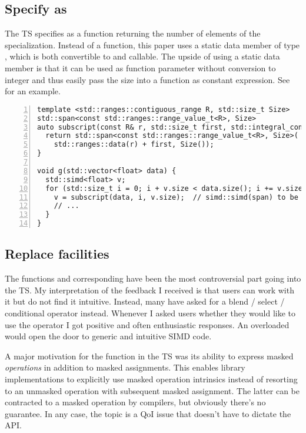 \subsection{Specify  as }
The TS specifies  as a  function returning the number of elements of the  specialization.
Instead of a function, this paper uses a static data member of type , which is both convertible to  and callable.
The upside of using a static data member is that it can be used as function parameter without conversion to integer and thus easily pass the size into a function as constant expression.
See  for an example.
\begin{lstlisting}[numbers=left,float={hbtp},label=lst:sizeparam,caption={
    Example: Pass \code{simd::size} as ``constant expression function argument''
}]
template <std::ranges::contiguous_range R, std::size_t Size>
std::span<const std::ranges::range_value_t<R>, Size>
auto subscript(const R& r, std::size_t first, std::integral_constant<std::size_t, Size>) {
  return std::span<const std::ranges::range_value_t<R>, Size>(
    std::ranges::data(r) + first, Size());
}

void g(std::vector<float> data) {
  std::simd<float> v;
  for (std::size_t i = 0; i + v.size < data.size(); i += v.size) {
    v = subscript(data, i, v.size);  // simd::simd(span) to be proposed
    // ...
  }
}
\end{lstlisting}


\subsection{Replace  facilities}

The  functions and corresponding  have been
the most controversial part going into the TS.
My interpretation of the feedback I received is that users can work with it but
do not find it intuitive.
Instead, many have asked for a blend / select / conditional operator instead.
Whenever I asked users whether they would like to use the  operator I
got positive and often enthusiastic responses.
An overloaded  would open the door to generic and intuitive
SIMD code.

A major motivation for the  function in the TS was its ability to
express masked \emph{operations} in addition to masked assignments.
This enables library implementations to explicitly use masked operation
intrinsics instead of resorting to an unmasked operation with subsequent masked
assignment.
The latter can be contracted to a masked operation by compilers, but obviously
there's no guarantee.
In any case, the topic is a QoI issue that doesn't have to dictate the API.

